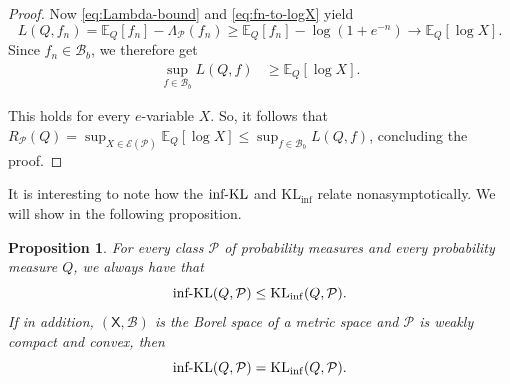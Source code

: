 \documentclass[11pt]{article}
\newcommand{\KLinf}{\mathrm{KL}_{\mathrm{inf}}}
\newcommand{\infKL}{\textnormal{inf-KL}}
\newcommand{\E}{\mathbb{E}}
\newcommand{\Pcal}{\mathcal{P}}
\newcommand{\X}{\mathsf{X}}
\newcommand{\B}{\mathcal{B}}
\newcommand{\Bb}{\mathcal{B}_b}
\newtheorem{proposition}[theorem]{Proposition}
\theoremstyle{definition}
\theoremstyle{definition}
\begin{document}
\begin{proof}
Now \eqref{eq:Lambda-bound} and \eqref{eq:fn-to-logX} yield
\[
L(Q,f_n)=\E_{Q}[f_n]-\Lambda_{\mathcal{P}}(f_n)\ge \E_{Q}[f_n]-\log(1+e^{-n}) \to \E_{Q}[\log X]. 
\]
Since $f_n \in \Bb$, we therefore get
\begin{align*}
\sup_{f\in\Bb} L(Q,f) &\ge  \E_{Q}[\log X].
\end{align*}

This holds for every $e$-variable $X$. So, it follows that $R_{\mathcal{P}}(Q)=\sup_{X\in\mathcal{E}(\mathcal{P})}\E_{Q}[\log X]\le\sup_{f\in\Bb}L(Q,f)$, concluding the proof.
\end{proof}

It is interesting to note how the $\infKL$ and $\KLinf$ relate nonasymptotically. We will show in the following proposition.

\begin{proposition}\label{prop:infkl-klinf}
For every class $\Pcal$ of probability measures and every probability measure $Q$, we always have that
\[
\infKL(Q,\Pcal)\le \KLinf(Q,\Pcal).
\]
If in addition, $(\X,\B)$ is the Borel space of a metric space and $\Pcal$ is weakly compact and convex, then
\[
\infKL(Q,\Pcal)=\KLinf(Q,\Pcal).
\]
\end{proposition}
\end{document}
